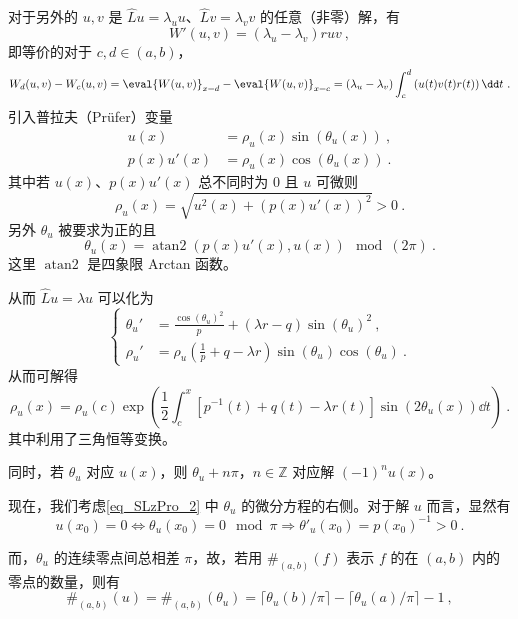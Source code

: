 对于另外的 $u, v$ 是 $\hat L u = \lambda_u u$、$\hat L v = \lambda_v v$ 的任意（非零）解，有
\begin{equation}
W'(u, v) = (\lambda_u - \lambda_v) r u v~,
\end{equation}
即等价的对于 $c, d \in (a, b)$，
\begin{equation}
W_d(u, v) - W_c(u, v) = \eval{W(u, v)}_{x = d} - \eval{W(u, v)}_{x = c} = (\lambda_u - \lambda_v) \int_c^d \left(u(t) v(t) r(t) \right) \dd t ~.
\end{equation}
引入普拉夫（Prüfer）变量
\begin{equation}
\begin{aligned}
u(x) &= \rho_u(x) \sin(\theta_u(x)) ~,\\
p(x) u'(x) &= \rho_u(x) \cos(\theta_u(x)) ~.
\end{aligned}
\end{equation}
其中若 $u(x)$、$p(x)u'(x)$ 总不同时为 $0$ 且 $u$ 可微则
\begin{equation}
\rho_u(x) = \sqrt{u^2(x) + \left(p(x) u'(x)\right)^2} > 0 ~.
\end{equation}
另外 $\theta_u$ 被要求为正的且
\begin{equation}
\theta_u(x) = \operatorname{atan2}(p(x)u'(x), u(x)) \mod (2\pi) ~.
\end{equation}
这里 $\operatorname{atan2}$ 是四象限 Arctan 函数。

从而 $\hat L u = \lambda u$ 可以化为
\begin{equation}\label{eq_SLzPro_2}
\left\{
    \begin{aligned}
    \theta_u' &= \frac{\cos(\theta_u)^2}{p} + (\lambda r - q) \sin(\theta_u)^2 ~,\\
    \rho_u' &= \rho_u(\frac{1}{p} + q - \lambda r) \sin(\theta_u) \cos(\theta_u)~.
    \end{aligned}
\right.
\end{equation}
从而可解得
\begin{equation}
\rho_u(x) = \rho_u(c) \exp(\frac{1}{2} \int_c^x \left[p^{-1}(t) + q(t) - \lambda r(t)\right]\sin\left(2 \theta_u(x)\right) \dd t) ~.
\end{equation}
其中利用了三角恒等变换。

同时，若 $\theta_u$ 对应 $u(x)$，则 $\theta_u + n \pi$，$n \in \mathbb Z$ 对应解 $\left(-1\right)^{n} u(x)$。

现在，我们考虑\autoref{eq_SLzPro_2} 中 $\theta_u$ 的微分方程的右侧。对于解 $u$ 而言，显然有
\begin{equation}
u(x_0) = 0 \Leftrightarrow \theta_u(x_0) = 0 \mod \pi \Rightarrow \theta'_u(x_0) = p(x_0)^{-1} > 0~.
\end{equation}

而，$\theta_u$ 的连续零点间总相差 $\pi$，故，若用 $\#_{(a, b)}(f)$ 表示 $f$ 的在 $(a, b)$ 内的零点的数量，则有
\begin{equation}
\#_{(a, b)} (u) = \#_{(a, b)} (\theta_u) = \lceil \theta_u(b)/\pi \rceil - \lceil \theta_u(a)/\pi \rceil -1~,
\end{equation}

